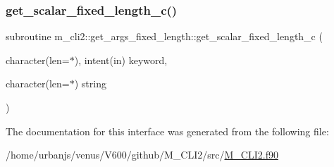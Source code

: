 \mbox{\label{interfacem__cli2_1_1get__args__fixed__length_a3dec369db225fffd4f9d71833686e19a}} 
\subsubsection{\texorpdfstring{get\+\_\+scalar\+\_\+fixed\+\_\+length\+\_\+c()}{get\_scalar\_fixed\_length\_c()}}
{\footnotesize\ttfamily subroutine m\+\_\+cli2\+::get\+\_\+args\+\_\+fixed\+\_\+length\+::get\+\_\+scalar\+\_\+fixed\+\_\+length\+\_\+c (\begin{DoxyParamCaption}\item[{character(len=$\ast$), intent(in)}]{keyword,  }\item[{character(len=$\ast$)}]{string }\end{DoxyParamCaption})\hspace{0.3cm}{\ttfamily [private]}}



The documentation for this interface was generated from the following file\+:\begin{DoxyCompactItemize}
\item 
/home/urbanjs/venus/\+V600/github/\+M\+\_\+\+C\+L\+I2/src/\mbox{\hyperlink{M__CLI2_8f90}{M\+\_\+\+C\+L\+I2.\+f90}}\end{DoxyCompactItemize}

